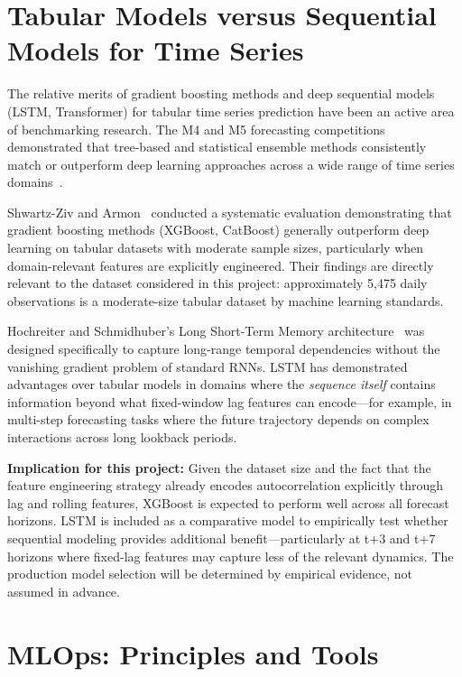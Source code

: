 \documentclass[12pt,a4paper]{report}
\begin{document}
\section{Tabular Models versus Sequential Models for Time Series}

The relative merits of gradient boosting methods and deep sequential models (LSTM, Transformer) for tabular time series prediction have been an active area of benchmarking research. The M4 and M5 forecasting competitions demonstrated that tree-based and statistical ensemble methods consistently match or outperform deep learning approaches across a wide range of time series domains~\cite{makridakis2018m4}.

Shwartz-Ziv and Armon~\cite{shwartzziv2022tabular} conducted a systematic evaluation demonstrating that gradient boosting methods (XGBoost, CatBoost) generally outperform deep learning on tabular datasets with moderate sample sizes, particularly when domain-relevant features are explicitly engineered. Their findings are directly relevant to the dataset considered in this project: approximately 5,475 daily observations is a moderate-size tabular dataset by machine learning standards.

Hochreiter and Schmidhuber's Long Short-Term Memory architecture~\cite{hochreiter1997lstm} was designed specifically to capture long-range temporal dependencies without the vanishing gradient problem of standard RNNs. LSTM has demonstrated advantages over tabular models in domains where the \textit{sequence itself} contains information beyond what fixed-window lag features can encode---for example, in multi-step forecasting tasks where the future trajectory depends on complex interactions across long lookback periods.

\textbf{Implication for this project:} Given the dataset size and the fact that the feature engineering strategy already encodes autocorrelation explicitly through lag and rolling features, XGBoost is expected to perform well across all forecast horizons. LSTM is included as a comparative model to empirically test whether sequential modeling provides additional benefit---particularly at t+3 and t+7 horizons where fixed-lag features may capture less of the relevant dynamics. The production model selection will be determined by empirical evidence, not assumed in advance.

\section{MLOps: Principles and Tools}
\end{document}
